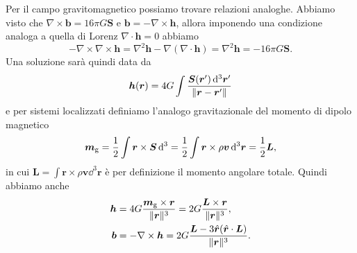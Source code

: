 Per il campo gravitomagnetico possiamo trovare relazioni analoghe.  Abbiamo
visto che $\nabla \times \bm{b} = 16 \pi G \bm{S}$ e
$\bm{b} = - \nabla \times \bm{h}$, allora imponendo una condizione analoga a
quella di Lorenz $\nabla \cdot \bm{h} = 0$ abbiamo
\begin{equation}
  -\nabla \times \nabla \times \bm{h} = \nabla^{2} \bm{h} - \nabla (\nabla \cdot
  \bm{h}) = \nabla^{2} \bm{h} = -16\pi G \bm{S}.
\end{equation}
Una soluzione sarà quindi data da
\begin{equation}
  \bm{h}(\bm{r}) = 4 G \int \frac{\bm{S}(\bm{r}') \mathop{}\!\mathrm{d}^{3} \bm{r}'}{\lVert\bm{r}
      - \bm{r}'\rVert}
\end{equation}
e per sistemi localizzati definiamo l'analogo gravitazionale del momento di
dipolo magnetico
\begin{equation}
  \bm{m}_{\textup{g}} = \frac{1}{2} \int \bm{r} \times \bm{S} \mathop{}\!\mathrm{d}^{3} =
  \frac{1}{2} \int \bm{r} \times \rho \bm{v} \mathop{}\!\mathrm{d}^{3} \bm{r} = \frac{1}{2} \bm{L},
\end{equation}
in cui $\bm{L} = \int \bm{r} \times \rho \bm{v} \dd^{3} \bm{r}$ è per
definizione il momento angolare totale.  Quindi abbiamo anche
\begin{subequations}
  \begin{align}
    \bm{h} &= 4G \frac{\bm{m}_{\textup{g}} \times \bm{r}}{\lVert\bm{r}\rVert^{3}} =
    2G \frac{\bm{L} \times \bm{r}}{\lVert\bm{r}\rVert^{3}}, \\
    \bm{b} &= -\nabla \times \bm{h} = 2G \frac{\bm{L} - 3\hat{\bm{r}}(\hat{\bm{r}}
      \cdot \bm{L})}{\lVert\bm{r}\rVert^{3}}.
  \end{align}
\end{subequations}



\section{}
\label{sec:red-shift-gravitazionale}

\section{}
\label{sec:generale-covarianza}

